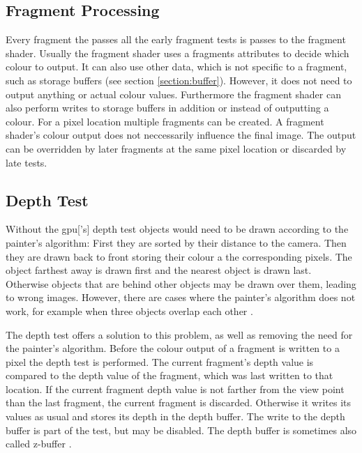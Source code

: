 \subsection{Fragment Processing}
Every fragment the passes all the early fragment tests is passes to the fragment shader. Usually the fragment shader uses a fragments attributes to decide which colour to output.
It can also use other data, which is not specific to a fragment, such as storage buffers (see section \ref{section:buffer}). However, it does not need to output anything or actual colour values. Furthermore the fragment shader can also perform writes to storage buffers in addition or instead of outputting a colour. For a pixel location multiple fragments can be created. A fragment shader's colour output does not neccessarily influence the final image. The output can be overridden by later fragments at the same pixel location or discarded by late tests.


\subsection{Depth Test}
\label{section:depthtest}
Without the \gls{gpu}['s] depth test objects would need to be drawn according to the painter's algorithm: First they are sorted by their distance to the camera. Then they are drawn back to front storing their colour a the corresponding pixels. The object farthest away is drawn first and the nearest object is drawn last. Otherwise objects that are behind other objects may be drawn over them, leading to wrong images. However, there are cases where the painter's algorithm does not work, for example when three objects overlap each other \cite{akine:2018:realtime}.

The depth test offers a solution to this problem, as well as removing the need for the painter's algorithm. Before the colour output of a fragment is written to a pixel the depth test is performed. The current fragment's depth value is compared to the depth value of the fragment, which was last written to that location.
If the current fragment depth value is not farther from the view point than the last fragment, the current fragment is discarded. Otherwise it writes its values as usual and stores its depth in the depth buffer. The write to the depth buffer is part of the test, but may be disabled. The depth buffer is sometimes also called z-buffer \cite{akine:2018:realtime}.


